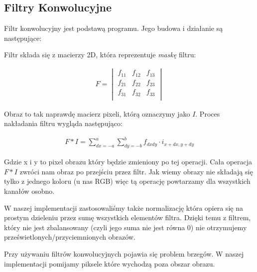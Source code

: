 \documentclass{article}
\begin{document}
\subsection{Filtry Konwolucyjne}
Filtr konwolucyjny jest podstawą programu. Jego budowa i działanie są następujące:

Filtr składa się z macierzy 2D, która reprezentuje \textit{maskę} filtru:

\begin{gather}
    F = 
       \begin{vmatrix}
        f_{11} & f_{12} & f_{13}\\
        f_{21} & f_{22} & f_{23}\\
        f_{31} & f_{32} & f_{33}\\
        \end{vmatrix}
\end{gather}

Obraz to tak naprawdę macierz pixeli, którą oznaczymy jako $I$.
Proces nakładania filtru wygląda następująco:

\begin{gather}
    F * I = \sum_{dx = -a}^{a} \sum_{dy = -b}^{b} f_{dxdy} \cdot i_{x+dx, y+dy}
\end{gather}

Gdzie x i y to pixel obrazu który będzie zmieniony po tej operacji. Cała operacja $F*I$ 
zwróci nam obraz po przejściu przez filtr. Jak wiemy obrazy nie składają się tylko 
z jednego koloru (u nas RGB) więc tą operację powtarzamy dla wszystkich kanałów osobno.

W naszej implementacji zastosowaliśmy także normalizację która opiera się na prostym dzieleniu
przez sumę wszystkich elementów filtra. Dzięki temu z filtrem, który nie jest zbalansowany (czyli jego suma
nie jest równa 0) nie otrzymujemy prześwietlonych/przyciemnionych obrazów.

Przy używaniu filtrów konwolucyjnych pojawia się problem brzegów. W naszej implementacji pomijamy
piksele które wychodzą poza obszar obrazu.
\end{document}
